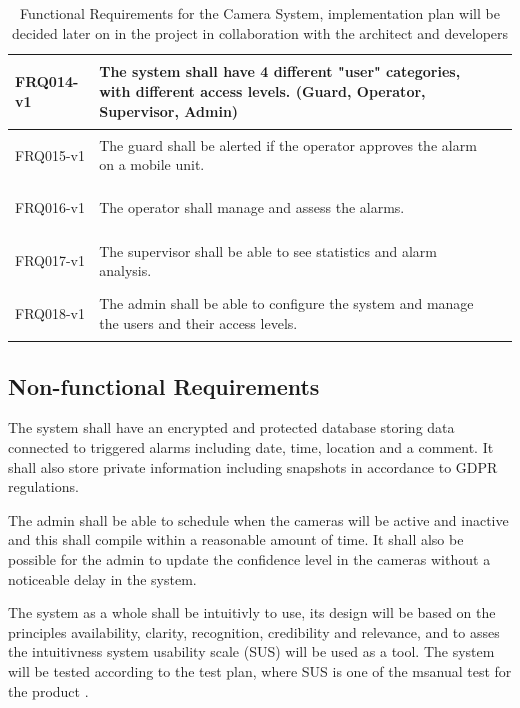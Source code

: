 \documentclass{article}
\begin{document}
\begin{table}[h]
\begin{tabular}{|l|p{8cm}|p{5cm}|}
\hline
\hypertarget{FRQ014}{FRQ014-v1} & The system shall have 4 different "user" categories, with different access levels. (Guard, Operator, Supervisor, Admin) &  \\
\hline
\hypertarget{FRQ015}{FRQ015-v1} & The guard shall be alerted if the operator approves the alarm on a mobile unit. &  \\
\hline
\hypertarget{FRQ016}{FRQ016-v1} & The operator shall manage and assess the alarms. &  \\
\hline
\hypertarget{FRQ017}{FRQ017-v1} & The supervisor shall be able to see statistics and alarm analysis. &  \\
\hline
\hypertarget{FRQ018}{FRQ018-v1} & The admin shall be able to configure the system and manage the users and their access levels. &  \\
\hline
\end{tabular}
\captionsetup{justification=centering}
\caption{Functional Requirements for the Camera System, implementation plan will be decided later on in the project in collaboration with the architect and developers}
\label{table:functional_requirements}
\end{table}

 




\subsection{Non-functional Requirements}
The system shall have an encrypted and protected database storing data connected to triggered alarms including date, time, location and a comment. It shall also store private information including snapshots in accordance to GDPR regulations. 

    The admin shall be able to schedule when the cameras will be active and inactive and this shall compile within a reasonable amount of time.  It shall also be possible for the admin to update the confidence level in the cameras without a noticeable delay in the system.   

The system as a whole shall be intuitivly to use, its design will be based on the principles availability, clarity, recognition, credibility and relevance, and to asses the intuitivness system usability scale (SUS) will be used as a tool. The system will be tested according to the test plan, where SUS is one of the msanual test for the product \cite{usabiltyPrinciples}. 
\end{document}
